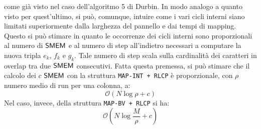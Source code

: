 come già visto nel caso dell'algoritmo 5 di Durbin. In modo analogo a quanto
visto per quest'ultimo, si può,
comunque, intuire come i vari cicli interni siano limitati superiormente dalla
larghezza del pannello e dai tempi di mapping. Questo si può stimare in quanto
le occorrenze dei cicli interni sono proporzionali al numero di $\mbox{\rm {\sf SMEM}}$ e al
numero 
di step all'indietro necessari a computare la nuova tripla $e_k$, $f_k$ e
$g_k$. Tale numero di 
step scala sulla cardinalità dei caratteri in overlap tra due $\mbox{\rm {\sf SMEM}}$
consecutivi. Fatta questa premessa, si può stimare che il calcolo dei $c$
$\mbox{\rm {\sf SMEM}}$ con
la struttura \texttt{MAP-INT + RLCP} è proporzionale, con $\rho$ numero medio di
run per una colonna, a:
\begin{equation}
  \label{eq:lcpmatchint}
  \mathcal{O}(N\log \rho+c)
\end{equation}
Nel caso, invece, della struttura \texttt{MAP-BV + RLCP} si ha:
\begin{equation}
  \label{eq:lcpmatchbv}
  \mathcal{O}\left(N\log\frac{M}{\rho}+c\right)
\end{equation}
